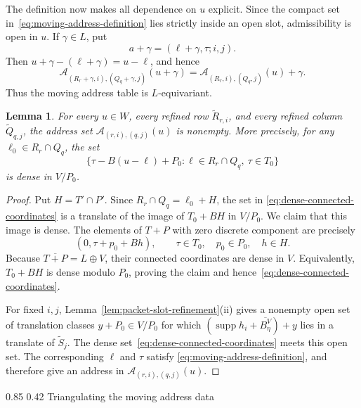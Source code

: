 \documentclass[11pt,reqno]{amsart}
\makeatletter
\numberwithin{equation}{section}
\renewcommand\subsection{\@startsection{subsection}{2}{\z@}%
  {0.85\baselineskip \@plus 0.25\baselineskip \@minus 0.10\baselineskip}%
  {0.42\baselineskip}%
  {\normalfont\bfseries}}
\newtheorem{lemma}[theorem]{Lemma}
\theoremstyle{definition}
\theoremstyle{remark}
\newcommand{\supp}{\operatorname{supp}}
\makeatother
\begin{document}
The definition now makes all dependence on $u$ explicit.  Since the compact
set in~\eqref{eq:moving-address-definition} lies strictly inside an open
slot, admissibility is open in $u$.  If $\gamma\in L$, put
\[
 a+\gamma=(\ell+\gamma,\tau;i,j).
\]
Then $u+\gamma-(\ell+\gamma)=u-\ell$, and hence
\begin{equation}\label{eq:moving-address-equivariance}
 \mathcal A_{(R_r+\gamma,i),(Q_q+\gamma,j)}(u+\gamma)
 =\mathcal A_{(R_r,i),(Q_q,j)}(u)+\gamma.
\end{equation}
Thus the moving address table is $L$-equivariant.

\begin{lemma}\label{lem:dense-row-orbits}
For every $u\in W$, every refined row $\widetilde R_{r,i}$, and every
refined column $\widetilde Q_{q,j}$, the address set
$\mathcal A_{(r,i),(q,j)}(u)$ is nonempty.  More precisely, for any
$\ell_0\in R_r\cap Q_q$, the set
\begin{equation}\label{eq:dense-connected-coordinates}
 \bigl\{\tau-B(u-\ell)+P_0:
   \ell\in R_r\cap Q_q,\ \tau\in T_0\bigr\}
\end{equation}
is dense in $V/P_0$.
\end{lemma}

\begin{proof}
Put $H=T'\cap P'$.  Since $R_r\cap Q_q=\ell_0+H$, the set in
\eqref{eq:dense-connected-coordinates} is a translate of the image of
$T_0+BH$ in $V/P_0$.  We claim that this image is dense.  The elements of
$T+P$ with zero discrete component are precisely
\[
 (0,\tau+p_0+Bh),
 \qquad \tau\in T_0,\quad p_0\in P_0,\quad h\in H.
\]
Because $\overline{T+P}=L\oplus V$, their connected coordinates are dense
in $V$.  Equivalently, $T_0+BH$ is dense modulo $P_0$, proving the claim and
hence~\eqref{eq:dense-connected-coordinates}.

For fixed $i,j$, Lemma~\ref{lem:packet-slot-refinement}(ii) gives a
nonempty open set of translation classes $y+P_0\in V/P_0$ for which
$(\supp h_i+\overline{B_\eta^V})+y$ lies in a translate of
$\widetilde S_j$.  The dense set~\eqref{eq:dense-connected-coordinates}
meets this open set.  The corresponding $\ell$ and $\tau$ satisfy
\eqref{eq:moving-address-definition}, and therefore give an address in
$\mathcal A_{(r,i),(q,j)}(u)$.
\end{proof}

\subsection{Triangulating the moving address data}
\end{document}
